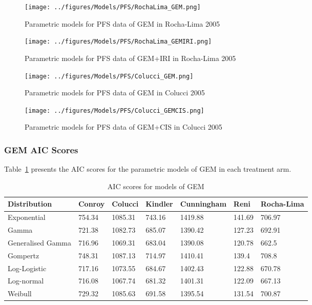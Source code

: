 \begin{figure}[h]
    \texttt{[image: ../figures/Models/PFS/RochaLima\_GEM.png]}
    \caption{Parametric models for PFS data of GEM in Rocha-Lima 2005}
\end{figure}

\begin{figure}[h]
    \texttt{[image: ../figures/Models/PFS/RochaLima\_GEMIRI.png]}
    \caption{Parametric models for PFS data of GEM+IRI in Rocha-Lima 2005}
\end{figure}

\begin{figure}[h]
    \texttt{[image: ../figures/Models/PFS/Colucci\_GEM.png]}
    \caption{Parametric models for PFS data of GEM in Colucci 2005}
\end{figure}

\begin{figure}[h]
    \texttt{[image: ../figures/Models/PFS/Colucci\_GEMCIS.png]}
    \caption{Parametric models for PFS data of GEM+CIS in Colucci 2005}
\end{figure}

\subsubsection*{GEM AIC Scores}

Table~\ref{AICPFS} presents the AIC scores for the parametric models of GEM in each treatment arm.

\begin{table}[h]
    \centering
    \begin{tabular}{|l|l|l|l|l|l|l|}
    \hline
        \bf{Distribution} & \bf{Conroy} & \bf{Colucci} & \bf{Kindler} & \bf{Cunningham} & \bf{Reni} & \bf{Rocha-Lima} \\ \hline
        Exponential & 754.34 & 1085.31 & 743.16 & 1419.88 & 141.69 & 706.97 \\ \hline
        Gamma & 721.38 & 1082.73 & 685.07 & 1390.42 & 127.23 & 692.91 \\ \hline
        Generalised Gamma & 716.96 & 1069.31 & 683.04 & 1390.08 & 120.78 & 662.5 \\ \hline
        Gompertz & 748.31 & 1087.13 & 714.97 & 1410.41 & 139.4 & 708.8 \\ \hline
        Log-Logistic & 717.16 & 1073.55 & 684.67 & 1402.43 & 122.88 & 670.78 \\ \hline
        Log-normal & 716.08 & 1067.74 & 681.32 & 1401.31 & 122.09 & 667.13 \\ \hline
        Weibull & 729.32 & 1085.63 & 691.58 & 1395.54 & 131.54 & 700.87 \\ \hline
    \end{tabular}
    \caption{AIC scores for models of GEM}
    \label{AICPFS}
\end{table}


